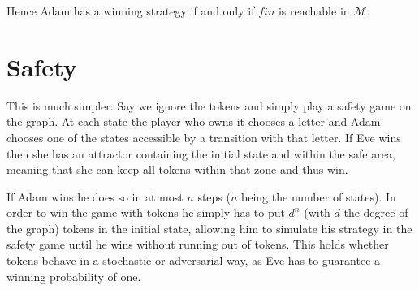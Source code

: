 \documentclass{article}
\begin{document}
	Hence Adam has a winning strategy if and only if $fin$ is reachable in $\mathcal{M}$.
	
	\newpage
	
	\section{Safety}
	
	This is much simpler: Say we ignore the tokens and simply play a safety game on the graph. At each state the player who owns it chooses a letter and Adam chooses one of the states accessible by a transition with that letter. If Eve wins then she has an attractor containing the initial state and within the safe area, meaning that she can keep all tokens within that zone and thus win. 
	
	If Adam wins he does so in at most $n$ steps ($n$ being the number of states). In order to win the game with tokens he simply has to put $d^n$ (with $d$ the degree of the graph) tokens in the initial state, allowing him to simulate his strategy in the safety game until he wins without running out of tokens. This holds whether tokens behave in a stochastic or adversarial way, as Eve has to guarantee a winning probability of one.

	

	
\end{document}
